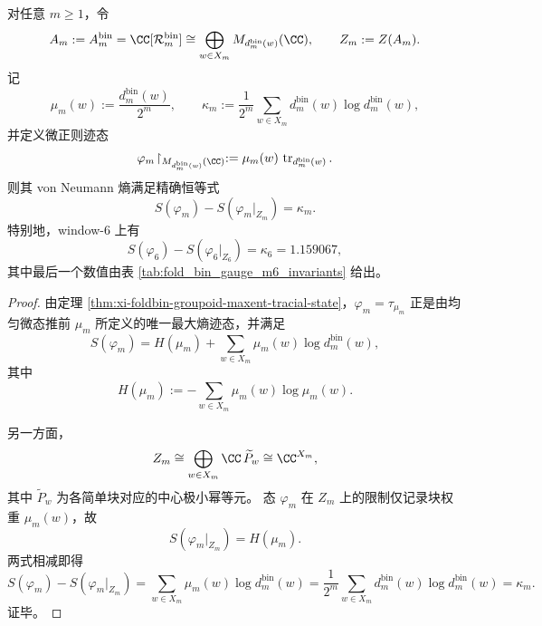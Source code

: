 \begin{theorem}[折叠缺陷的非交换条件熵恒等式]\label{thm:conclusion-fold-defect-noncommutative-conditional-entropy-identity}
对任意 \(m\ge 1\)，令
\[
A_m:=A_m^{\mathrm{bin}}
=
\CC[\mathcal R_m^{\mathrm{bin}}]
\cong
\bigoplus_{w\in X_m}M_{d_m^{\mathrm{bin}}(w)}(\CC),
\qquad
Z_m:=Z(A_m).
\]
记
\[
\mu_m(w):=\frac{d_m^{\mathrm{bin}}(w)}{2^m},
\qquad
\kappa_m:=\frac{1}{2^m}\sum_{w\in X_m}d_m^{\mathrm{bin}}(w)\log d_m^{\mathrm{bin}}(w),
\]
并定义微正则迹态
\[
\varphi_m\!\restriction_{M_{d_m^{\mathrm{bin}}(w)}(\CC)}
:=
\mu_m(w)\,\operatorname{tr}_{d_m^{\mathrm{bin}}(w)}.
\]
则其 von Neumann 熵满足精确恒等式
\[
S(\varphi_m)-S(\varphi_m|_{Z_m})=\kappa_m.
\]
特别地，window-\(6\) 上有
\[
S(\varphi_6)-S(\varphi_6|_{Z_6})=\kappa_6=1.159067,
\]
其中最后一个数值由表 \ref{tab:fold_bin_gauge_m6_invariants} 给出。
\end{theorem}
\begin{proof}
由定理 \ref{thm:xi-foldbin-groupoid-maxent-tracial-state}，\(\varphi_m=\tau_{\mu_m}\) 正是由均匀微态推前 \(\mu_m\) 所定义的唯一最大熵迹态，并满足
\[
S(\varphi_m)
=
H(\mu_m)+\sum_{w\in X_m}\mu_m(w)\log d_m^{\mathrm{bin}}(w),
\]
其中
\[
H(\mu_m):=-\sum_{w\in X_m}\mu_m(w)\log\mu_m(w).
\]

另一方面，
\[
Z_m\cong \bigoplus_{w\in X_m}\CC\,\widetilde P_w\cong \CC^{X_m},
\]
其中 \(\widetilde P_w\) 为各简单块对应的中心极小幂等元。
态 \(\varphi_m\) 在 \(Z_m\) 上的限制仅记录块权重 \(\mu_m(w)\)，故
\[
S(\varphi_m|_{Z_m})=H(\mu_m).
\]
两式相减即得
\[
S(\varphi_m)-S(\varphi_m|_{Z_m})
=
\sum_{w\in X_m}\mu_m(w)\log d_m^{\mathrm{bin}}(w)
=
\frac{1}{2^m}\sum_{w\in X_m}d_m^{\mathrm{bin}}(w)\log d_m^{\mathrm{bin}}(w)
=
\kappa_m.
\]
证毕。
\end{proof}

